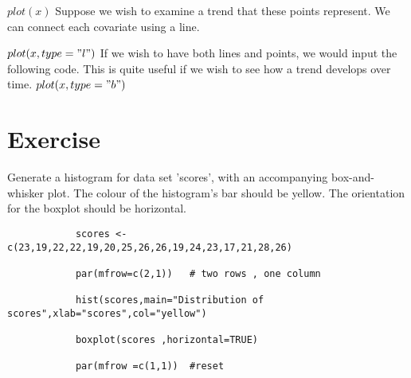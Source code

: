 			$plot(x)$
			Suppose we wish to examine a trend that these points represent. We can connect each covariate using a line.
			
			$plot(x, type = "l")$
			If we wish to have both lines and points, we would input the following code. This is quite useful if we wish to see how a trend develops over time.
			$plot(x, type = "b")$
			
			
			
			\section{Exercise}
			
			Generate a histogram for data set 'scores', with an accompanying box-and-whisker plot.
			The colour of the histogram's bar should be yellow. The orientation for the boxplot should be horizontal.
			
			\begin{verbatim}
			scores <-c(23,19,22,22,19,20,25,26,26,19,24,23,17,21,28,26)
			
			par(mfrow=c(2,1)) 	# two rows , one column
			
			hist(scores,main="Distribution of scores",xlab="scores",col="yellow")
			
			boxplot(scores ,horizontal=TRUE)
			
			par(mfrow =c(1,1)) 	#reset
			\end{verbatim}